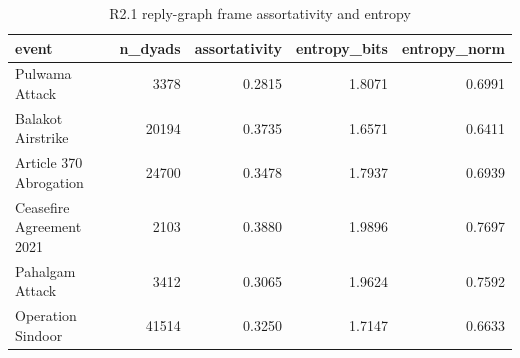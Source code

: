 \begin{table}
\caption{R2.1 reply-graph frame assortativity and entropy}
\label{tab:r1r2_assortativity}
\begin{tabular}{lrrrr}
\toprule
event & n\_dyads & assortativity & entropy\_bits & entropy\_norm \\
\midrule
Pulwama Attack & 3378 & 0.2815 & 1.8071 & 0.6991 \\
Balakot Airstrike & 20194 & 0.3735 & 1.6571 & 0.6411 \\
Article 370 Abrogation & 24700 & 0.3478 & 1.7937 & 0.6939 \\
Ceasefire Agreement 2021 & 2103 & 0.3880 & 1.9896 & 0.7697 \\
Pahalgam Attack & 3412 & 0.3065 & 1.9624 & 0.7592 \\
Operation Sindoor & 41514 & 0.3250 & 1.7147 & 0.6633 \\
\bottomrule
\end{tabular}
\end{table}
